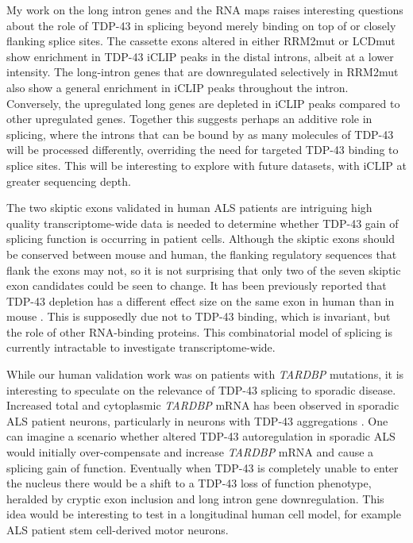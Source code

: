  My work on the long intron genes and the RNA maps raises interesting questions about the role of TDP-43 in splicing beyond merely binding on top of or closely flanking splice sites. 
 The cassette exons altered in either RRM2mut or LCDmut show enrichment in TDP-43 iCLIP peaks in the distal introns, albeit at a lower intensity. 
 The long-intron genes that are downregulated selectively in RRM2mut also show a general enrichment in iCLIP peaks throughout the intron.
 Conversely, the upregulated long genes are depleted in iCLIP peaks compared to other upregulated genes.
 Together this suggests perhaps an additive role in splicing, where the introns that can be bound by as many molecules of TDP-43 will be processed differently, overriding the need for targeted TDP-43 binding to splice sites.
 This will be interesting to explore with future datasets, with iCLIP at greater sequencing depth. 

 
 The two skiptic exons validated in human ALS patients are intriguing high quality transcriptome-wide data is needed to determine whether TDP-43 gain of splicing function is occurring in patient cells.
 Although the skiptic exons should be conserved between mouse and human, the flanking regulatory sequences that flank the exons may not, so it is not surprising that only two of the seven skiptic exon candidates could be seen to change. It has been previously reported that TDP-43 depletion has a different effect size on the same exon in human than in mouse \cite{Mohagheghi2016}. 
 This is supposedly due not to TDP-43 binding, which is invariant, but the role of other RNA-binding proteins.
This combinatorial model of splicing is currently intractable to investigate transcriptome-wide. %
 
 While our human validation work was on patients with \textit{TARDBP} mutations, it is interesting to speculate on the relevance of TDP-43 splicing to sporadic disease. 
 Increased total and cytoplasmic \textit{TARDBP} mRNA has been observed in sporadic ALS patient neurons, particularly in neurons with TDP-43 aggregations \citep{Koyama2016}.
 One can imagine a scenario whether altered TDP-43 autoregulation in sporadic ALS would initially over-compensate and increase \textit{TARDBP} mRNA and cause a splicing gain of function.
 Eventually when TDP-43 is completely unable to enter the nucleus there would be a shift to a TDP-43 loss of function phenotype, heralded by cryptic exon inclusion and long intron gene downregulation.  
 This idea would be interesting to test in a longitudinal human cell model, for example ALS patient stem cell-derived motor neurons.
 
